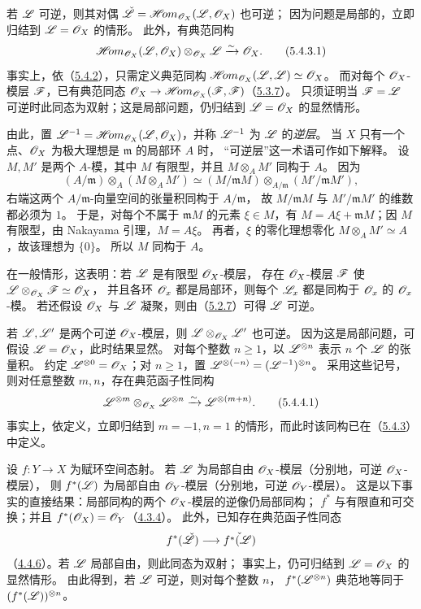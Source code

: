 若 $\mathscr L$ 可逆，则其对偶 $\check{\mathscr L}=\mathscr{H}\!om_{\mathscr O_X}(\mathscr L,\mathscr O_X)$ 也可逆；
因为问题是局部的，立即归结到 $\mathscr L=\mathscr O_X$ 的情形。
此外，有典范同构
\begin{equation}
 \mathscr{H}\!om_{\mathscr O_X}(\mathscr L,\mathscr O_X)\otimes_{\mathscr O_X}\mathscr L
 \xrightarrow{\sim}\mathscr O_X.
 \tag{5.4.3.1}\label{eq:0:5.4.3.1}
\end{equation}
事实上，依（\hyperlink{para:0:5.4.2}{5.4.2}），只需定义典范同构
$\mathscr{H}\!om_{\mathscr O_X}(\mathscr L,\mathscr L)\simeq\mathscr O_X$。
而对每个 $\mathscr O_X$-模层 $\mathscr F$，已有典范同态
$\mathscr O_X\to\mathscr{H}\!om_{\mathscr O_X}(\mathscr F,\mathscr F)$（\hyperlink{para:0:5.3.7}{5.3.7}）。
只须证明当 $\mathscr F=\mathscr L$ 可逆时此同态为双射；这是局部问题，仍归结到 $\mathscr L=\mathscr O_X$ 的显然情形。

由此，置 $\mathscr L^{-1}=\mathscr{H}\!om_{\mathscr O_X}(\mathscr L,\mathscr O_X)$，并称 $\mathscr L^{-1}$ 为 $\mathscr L$ 的\emph{逆层}。
当 $X$ 只有一个点、$\mathscr O_X$ 为极大理想是 $\mathfrak m$ 的局部环 $A$ 时，
“可逆层”这一术语可作如下解释。
设 $M,M'$ 是两个 $A$-模，其中 $M$ 有限型，并且 $M\otimes_A M'$ 同构于 $A$。
因为
\[
 (A/\mathfrak m)\otimes_A(M\otimes_A M')
 \simeq(M/\mathfrak mM)\otimes_{A/\mathfrak m}(M'/\mathfrak mM'),
\]
右端这两个 $A/\mathfrak m$-向量空间的张量积同构于 $A/\mathfrak m$，
故 $M/\mathfrak mM$ 与 $M'/\mathfrak mM'$ 的维数都必须为 $1$。
于是，对每个不属于 $\mathfrak mM$ 的元素 $\xi\in M$，有
$M=A\xi+\mathfrak mM$；因 $M$ 有限型，由 Nakayama 引理，$M=A\xi$。
再者，$\xi$ 的零化理想零化 $M\otimes_A M'\simeq A$，故该理想为 $\{0\}$。
所以 $M$ 同构于 $A$。

在一般情形，这表明：若 $\mathscr L$ 是有限型 $\mathscr O_X$-模层，
存在 $\mathscr O_X$-模层 $\mathscr F$ 使 $\mathscr L\otimes_{\mathscr O_X}\mathscr F\simeq\mathscr O_X$，
并且各环 $\mathscr O_x$ 都是局部环，则每个 $\mathscr L_x$ 都是同构于 $\mathscr O_x$ 的 $\mathscr O_x$-模。
若还假设 $\mathscr O_X$ 与 $\mathscr L$ 凝聚，则由（\hyperlink{para:0:5.2.7}{5.2.7}）可得 $\mathscr L$ 可逆。

若 $\mathscr L,\mathscr L'$ 是两个可逆 $\mathscr O_X$-模层，则 $\mathscr L\otimes_{\mathscr O_X}\mathscr L'$ 也可逆。
因为这是局部问题，可假设 $\mathscr L=\mathscr O_X$，此时结果显然。
对每个整数 $n\geq1$，以 $\mathscr L^{\otimes n}$ 表示 $n$ 个 $\mathscr L$ 的张量积。
约定 $\mathscr L^{\otimes0}=\mathscr O_X$；对 $n\geq1$，置
$\mathscr L^{\otimes(-n)}=(\mathscr L^{-1})^{\otimes n}$。
采用这些记号，则对任意整数 $m,n$，存在典范函子性同构
\begin{equation}
 \mathscr L^{\otimes m}\otimes_{\mathscr O_X}\mathscr L^{\otimes n}
 \xrightarrow{\sim}\mathscr L^{\otimes(m+n)}.
 \tag{5.4.4.1}\label{eq:0:5.4.4.1}
\end{equation}
事实上，依定义，立即归结到 $m=-1,n=1$ 的情形，而此时该同构已在（\hyperlink{para:0:5.4.3}{5.4.3}）中定义。

设 $f\colon Y\to X$ 为赋环空间态射。
若 $\mathscr L$ 为局部自由 $\mathscr O_X$-模层（分别地，可逆 $\mathscr O_X$-模层），
则 $f^*(\mathscr L)$ 为局部自由 $\mathscr O_Y$-模层（分别地，可逆 $\mathscr O_Y$-模层）。
这是以下事实的直接结果：局部同构的两个 $\mathscr O_X$-模层的逆像仍局部同构；
$f^*$ 与有限直和可交换；并且 $f^*(\mathscr O_X)=\mathscr O_Y$（\hyperlink{para:0:4.3.4}{4.3.4}）。
此外，已知存在典范函子性同态
\[
 f^*(\check{\mathscr L})\longrightarrow\check{f^*(\mathscr L)}
\]
（\hyperlink{para:0:4.4.6}{4.4.6}）。若 $\mathscr L$ 局部自由，则此同态为双射；
事实上，仍可归结到 $\mathscr L=\mathscr O_X$ 的显然情形。
由此得到，若 $\mathscr L$ 可逆，则对每个整数 $n$，
$f^*(\mathscr L^{\otimes n})$ 典范地等同于 $(f^*(\mathscr L))^{\otimes n}$。

